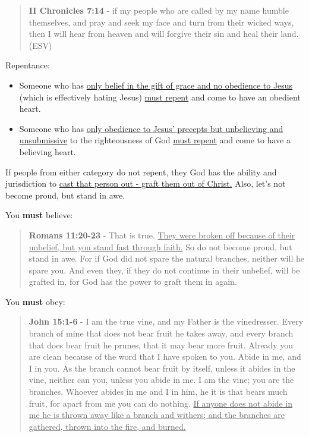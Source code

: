 \documentclass[11pt]{article}
\begin{document}
\begin{quote}
\textbf{II Chronicles 7:14} - if my people who are called by my name humble themselves, and pray and seek my face and turn from their wicked ways, then I will hear from heaven and will forgive their sin and heal their land. (ESV)
\end{quote}

Repentance:
\begin{itemize}
\item Someone who has \uline{only belief in the gift of grace and no obedience to Jesus} (which is effectively hating Jesus) \uline{must repent} and come to have an obedient heart.
\item Someone who has \uline{only obedience to Jesus' precepts but unbelieving and unsubmissive} to the righteousness of God \uline{must repent} and come to have a believing heart.
\end{itemize}

If people from either category do not repent, they God has the ability and jurisdiction to \uline{cast that person out - graft them out of Christ.} Also, let's not become proud, but stand in awe.

You \textbf{must} believe:

\begin{quote}
\textbf{Romans 11:20-23} - That is true. \uline{They were broken off because of their unbelief, but you stand fast through faith.} So do not become proud, but stand in awe. For if God did not spare the natural branches, neither will he spare you. And even they, if they do not continue in their unbelief, will be grafted in, for God has the power to graft them in again.
\end{quote}

You \textbf{must} obey:

\begin{quote}
\textbf{John 15:1-6} - I am the true vine, and my Father is the vinedresser.  Every branch of mine that does not bear fruit he takes away, and every branch that does bear fruit he prunes, that it may bear more fruit.  Already you are clean because of the word that I have spoken to you.  Abide in me, and I in you. As the branch cannot bear fruit by itself, unless it abides in the vine, neither can you, unless you abide in me.  I am the vine; you are the branches. Whoever abides in me and I in him, he it is that bears much fruit, for apart from me you can do nothing. \uline{If anyone does not abide in me he is thrown away like a branch and withers; and the branches are gathered, thrown into the fire, and burned.}
\end{quote}
\end{document}
